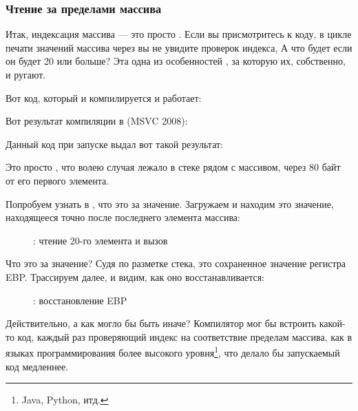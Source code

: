 \subsubsection{Чтение за пределами массива}

Итак, индексация массива --- это просто .  %
Если вы присмотритесь к коду, в цикле печати значений массива через \printf вы 
не увидите проверок индекса,  
А что будет если он будет 20 или больше? 
Эта одна из особенностей \CCpp, за которую их, собственно, и ругают.

Вот код, который и компилируется и работает:



Вот результат компиляции в (MSVC 2008):



Данный код при запуске выдал вот такой результат:



Это просто , что волею случая лежало в стеке рядом с массивом, 
через 80 байт от его первого элемента.

\clearpage
\myindex{\olly}
Попробуем узнать в \olly, что это за значение.
Загружаем и находим это значение, находящееся точно после последнего элемента массива:

\begin{figure}[H]
\centering
{}
\caption{\olly: чтение 20-го элемента и вызов \printf}
\label{fig:array_BO_olly_r1}
\end{figure}

Что это за значение? 
Судя по разметке стека, это сохраненное значение регистра EBP.
\clearpage
Трассируем далее, и видим, как оно восстанавливается:

\begin{figure}[H]
\centering
{}
\caption{\olly: восстановление EBP}
\label{fig:array_BO_olly_r2}
\end{figure}

Действительно, а как могло бы быть иначе? Компилятор мог бы встроить какой-то код, 
каждый раз проверяющий индекс на соответствие пределам массива, как в языках программирования 
более высокого уровня\footnote{Java, Python, итд.}, что делало бы запускаемый код медленнее.

